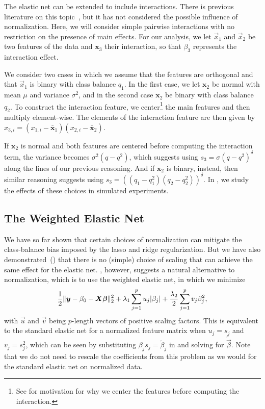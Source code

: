 The elastic net can be extended to include interactions. There is previous literature on
this topic~\citep{bien2013,zemlianskaia2022,lim2015}, but it has not considered the
possible influence of normalization. Here, we will consider simple pairwise interactions
with no restriction on the presence of main effects. For our analysis, we let \(\vec{x}_1\)
and \(\vec{x}_2\) be two features of the data and \(\bm{x}_3\) their interaction, so that
\(\beta_3\) represents the interaction effect.

We consider two cases in which we assume that the features are orthogonal and that
\(\vec{x}_1\) is binary with class balance \(q_1\). In the first case, we let \(\bm{x}_2\)
be normal with mean \(\mu\) and variance \(\sigma^2\), and in the second case \(\bm{x}_2\)
be binary with class balance \(q_2\). To construct the interaction feature, we
center\footnote{See  for motivation for why we center the
  features before computing the interaction.} the main features and then multiply
element-wise. The elements of the interaction feature are then given by \(x_{3,i} =
(x_{1,i} - \bar{\bm{x}}_1)(x_{2,i} - \bar{\bm{x}}_2)\).

If \(\bm{x}_2\) is normal and both features are centered before computing the interaction
term, the variance becomes \(\sigma^2 (q-q^2)\), which suggests using \(s_3 = \sigma (q -
q^2)^\delta\) along the lines of our previous reasoning. And if \(\bm{x}_2\) is binary,
instead, then similar reasoning suggests using \(s_3 = ((q_1-q_1^2)(q_2-q_2^2))^\delta\).
In , we study the effects of these choices in simulated
experiments.

\subsection{The Weighted Elastic Net}\label{sec:binary-weighting}

We have so far shown that certain choices of normalization can mitigate the class-balance
bias imposed by the lasso and ridge regularization. But we have also
demonstrated~() that there is no (simple) choice of
scaling that can achieve the same effect for the elastic net.
, however, suggests a natural alternative to normalization,
which is to use the weighted elastic net, in which we minimize
\[
  \frac{1}{2} \lVert \boldsymbol{y} - \beta_0 - \boldsymbol{X}\boldsymbol{\beta}\rVert_2^2 + \lambda_1 \sum_{j=1}^p u_j |\beta_j| + \frac{\lambda_2}{2} \sum_{j=1}^p v_j \beta_j^2,
\]
with \(\vec{u}\) and \(\vec{v}\) being \(p\)-length vectors of positive scaling factors.
This is equivalent to the standard elastic net for a normalized feature matrix when \(u_j =
s_j\) and \(v_j = s_j^2\), which can be seen by substituting \(\beta_js_j =
\tilde{\beta}_j\) in  and solving for \(\tilde{\vec{\beta}}\). Note
that we do not need to rescale the coefficients from this problem as we would for the
standard elastic net on normalized data.


